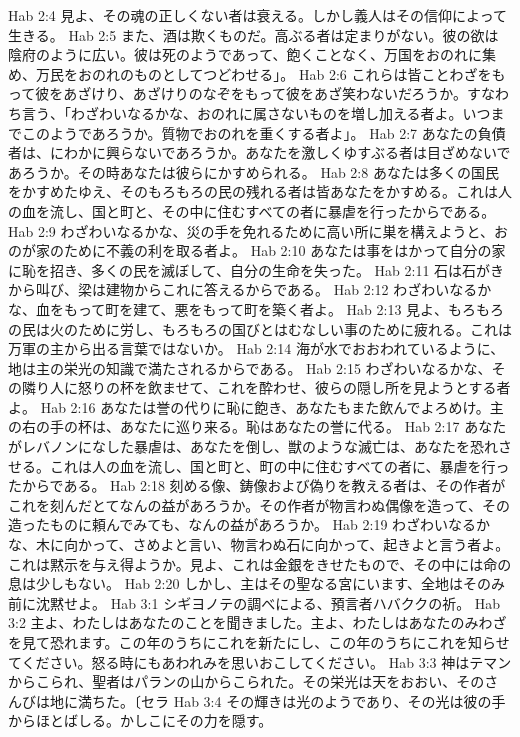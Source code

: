 Hab 2:4  見よ、その魂の正しくない者は衰える。しかし義人はその信仰によって生きる。
Hab 2:5  また、酒は欺くものだ。高ぶる者は定まりがない。彼の欲は陰府のように広い。彼は死のようであって、飽くことなく、万国をおのれに集め、万民をおのれのものとしてつどわせる」。
Hab 2:6  これらは皆ことわざをもって彼をあざけり、あざけりのなぞをもって彼をあざ笑わないだろうか。すなわち言う、「わざわいなるかな、おのれに属さないものを増し加える者よ。いつまでこのようであろうか。質物でおのれを重くする者よ」。
Hab 2:7  あなたの負債者は、にわかに興らないであろうか。あなたを激しくゆすぶる者は目ざめないであろうか。その時あなたは彼らにかすめられる。
Hab 2:8  あなたは多くの国民をかすめたゆえ、そのもろもろの民の残れる者は皆あなたをかすめる。これは人の血を流し、国と町と、その中に住むすべての者に暴虐を行ったからである。
Hab 2:9  わざわいなるかな、災の手を免れるために高い所に巣を構えようと、おのが家のために不義の利を取る者よ。
Hab 2:10  あなたは事をはかって自分の家に恥を招き、多くの民を滅ぼして、自分の生命を失った。
Hab 2:11  石は石がきから叫び、梁は建物からこれに答えるからである。
Hab 2:12  わざわいなるかな、血をもって町を建て、悪をもって町を築く者よ。
Hab 2:13  見よ、もろもろの民は火のために労し、もろもろの国びとはむなしい事のために疲れる。これは万軍の主から出る言葉ではないか。
Hab 2:14  海が水でおおわれているように、地は主の栄光の知識で満たされるからである。
Hab 2:15  わざわいなるかな、その隣り人に怒りの杯を飲ませて、これを酔わせ、彼らの隠し所を見ようとする者よ。
Hab 2:16  あなたは誉の代りに恥に飽き、あなたもまた飲んでよろめけ。主の右の手の杯は、あなたに巡り来る。恥はあなたの誉に代る。
Hab 2:17  あなたがレバノンになした暴虐は、あなたを倒し、獣のような滅亡は、あなたを恐れさせる。これは人の血を流し、国と町と、町の中に住むすべての者に、暴虐を行ったからである。
Hab 2:18  刻める像、鋳像および偽りを教える者は、その作者がこれを刻んだとてなんの益があろうか。その作者が物言わぬ偶像を造って、その造ったものに頼んでみても、なんの益があろうか。
Hab 2:19  わざわいなるかな、木に向かって、さめよと言い、物言わぬ石に向かって、起きよと言う者よ。これは黙示を与え得ようか。見よ、これは金銀をきせたもので、その中には命の息は少しもない。
Hab 2:20  しかし、主はその聖なる宮にいます、全地はそのみ前に沈黙せよ。
Hab 3:1  シギヨノテの調べによる、預言者ハバククの祈。
Hab 3:2  主よ、わたしはあなたのことを聞きました。主よ、わたしはあなたのみわざを見て恐れます。この年のうちにこれを新たにし、この年のうちにこれを知らせてください。怒る時にもあわれみを思いおこしてください。
Hab 3:3  神はテマンからこられ、聖者はパランの山からこられた。その栄光は天をおおい、そのさんびは地に満ちた。〔セラ
Hab 3:4  その輝きは光のようであり、その光は彼の手からほとばしる。かしこにその力を隠す。
